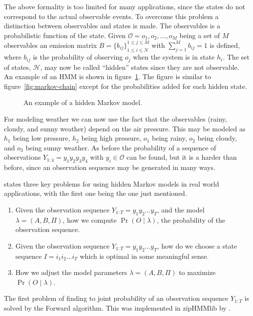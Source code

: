 The above formality is too limited for many applications, since the states do
not correspond to the actual observable events. To overcome this problem a
distinction between observables and states is made. The observables is a
probabilistic function of the state. Given
$\mathcal{O} = {o_1, o_2, \dots, o_M}$ being a set of $M$ observables an
emission matrix $B = {\{b_{ij}\}}_{1 \le i \le N}^{1 \le j \le M}$ with
$\sum_{j=1}^M b_{ij} = 1$ is defined, where $b_{ij}$ is the probability of
observing $o_j$ when the system is in state $h_i$. The set of states,
$\mathcal{H}$, may now be called ``hidden'' states since they are not
observable. An example of an HMM is shown in
figure~\ref{fig:hidden-markov-model}. The figure is similar to
figure~\ref{fig:markov-chain} except for the probabilities added for each
hidden state.

\begin{figure}
  \centering
  
  \caption{An example of a hidden Markov model.}
  \label{fig:hidden-markov-model}
\end{figure}

For modeling weather we can now use the fact that the observables (rainy,
cloudy, and sunny weather) depend on the air pressure. This may be modeled as
$h_1$ being low pressure, $h_2$ being high pressure, $o_1$ being rainy, $o_2$
being cloudy, and $o_3$ being sunny weather. As before the probability of a
sequence of observations $Y_{1:4} = y_1y_2y_3y_4$ with $y_i \in \mathcal{O}$
can be found, but it is a harder than before, since an observation sequence may be
generated in many ways.

\citet{rabiner1989tutorial} states three key problems for using hidden Markov
models in real world applications, with the first one being the one just
mentioned.
\begin{enumerate}
\item Given the observation sequence $Y_{1:T} = y_1y_2\dots{}y_T$, and the
  model $\lambda = (A, B, \Pi)$, how we compute $\Pr(O \mid \lambda)$, the
  probability of the observation sequence.
\item Given the observation sequence $Y_{1:T} = y_1y_2\dots{}y_T$, how do we
  choose a state sequence $I = i_1i_2\dots{}i_T$ which is optimal in some
  meaningful sense.
\item How we adjust the model parameters $\lambda = (A, B, \Pi)$ to maximize
  $\Pr(O \mid \lambda)$.
\end{enumerate}

The first problem of finding to joint probability of an observation sequence
$Y_{1:T}$ is solved by the Forward algorithm. This was implemented in zipHMMlib
by \citet{sand2013ziphmmlib}.

